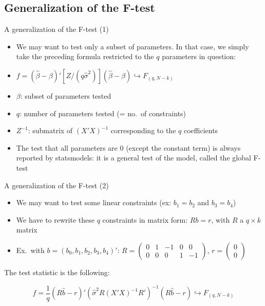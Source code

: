\documentclass[aspectratio=169]{beamer}
\begin{document}
\subsection{Generalization of the F-test}

\begin{frame}{A generalization of the F-test (1)}
\begin{itemize}
    \item We may want to test only a subset of parameters. In that case, we simply take the preceding formula restricted to the $q$ parameters in question:
    \item $f = (\hat{\beta} - \beta)'[Z/(q\hat{\sigma}^2)](\hat{\beta} - \beta) \hookrightarrow F_{(q,N-k)}$
    \item $\beta$: subset of parameters tested
    \item $q$: number of parameters tested (= no.\ of constraints)
    \item $Z^{-1}$: submatrix of $(X'X)^{-1}$ corresponding to the $q$ coefficients
    \item The test that all parameters are 0 (except the constant term) is always reported by statsmodels: it is a general test of the model, called the global F-test
\end{itemize}
\end{frame}

\begin{frame}{A generalization of the F-test (2)}
\begin{itemize}
    \item We may want to test some linear constraints (ex: $b_1 = b_2$ and $b_3 = b_4$)
    \item We have to rewrite these $q$ constraints in matrix form: $Rb = r$, with $R$ a $q \times k$ matrix
    \item Ex.\ with $b = (b_0, b_1, b_2, b_3, b_4)'$: $R = \begin{pmatrix} 0 & 1 & -1 & 0 & 0 \\ 0 & 0 & 0 & 1 & -1 \end{pmatrix}$, $r = \begin{pmatrix} 0 \\ 0 \end{pmatrix}$
\end{itemize}

The test statistic is the following:

\[
f = \frac{1}{q}(R\hat{b} - r)'(\hat{\sigma}^2 R(X'X)^{-1}R')^{-1}(R\hat{b} - r) \hookrightarrow F_{(q,N-k)}
\]
\end{frame}
\end{document}
